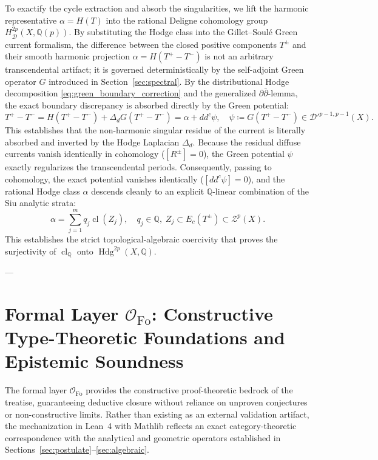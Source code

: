 \documentclass[11pt,a4paper]{article}
\theoremstyle{definition}
\theoremstyle{plain}
\DeclareMathOperator{\Hdg}{Hdg}
\DeclareMathOperator{\cl}{cl}
\begin{document}
To exactify the cycle extraction and absorb the singularities, we lift the harmonic representative $\alpha = H(T)$ into the rational Deligne cohomology group $H^{2p}_{\mathcal{D}}(X, \mathbb{Q}(p))$. By substituting the Hodge class into the Gillet--Soulé Green current formalism, the difference between the closed positive components $T^\pm$ and their smooth harmonic projection $\alpha = H(T^+ - T^-)$ is not an arbitrary transcendental artifact; it is governed deterministically by the self-adjoint Green operator $G$ introduced in Section~\ref{sec:spectral}. By the distributional Hodge decomposition \eqref{eq:green_boundary_correction} and the generalized $\partial \bar{\partial}$-lemma, the exact boundary discrepancy is absorbed directly by the Green potential:
\begin{equation}
    \label{eq:current_potential}
    T^+ - T^- = H(T^+ - T^-) + \Delta_d G(T^+ - T^-) = \alpha + dd^c \psi, \quad \psi \coloneqq G(T^+ - T^-) \in \mathcal{D}'^{p-1, p-1}(X).
\end{equation}
This establishes that the non-harmonic singular residue of the current is literally absorbed and inverted by the Hodge Laplacian $\Delta_d$. Because the residual diffuse currents vanish identically in cohomology ($[R^\pm] = 0$), the Green potential $\psi$ exactly regularizes the transcendental periods. Consequently, passing to cohomology, the exact potential vanishes identically ($[dd^c \psi] = 0$), and the rational Hodge class $\alpha$ descends cleanly to an explicit $\mathbb{Q}$-linear combination of the Siu analytic strata:
\begin{equation}
    \label{eq:cycle_decomposition}
    \alpha = \sum_{j=1}^m q_j \cl(Z_j), \quad q_j \in \mathbb{Q}, \; Z_j \subset E_c(T^\pm) \subset \mathcal{Z}^p(X).
\end{equation}
This establishes the strict topological-algebraic coercivity that proves the surjectivity of $\cl_{\mathbb{Q}}$ onto $\Hdg^{2p}(X, \mathbb{Q})$.

---

\section{Formal Layer $\mathcal{O}_{\mathrm{Fo}}$: Constructive Type-Theoretic Foundations and Epistemic Soundness}
\label{sec:formal}

The formal layer $\mathcal{O}_{\mathrm{Fo}}$ provides the constructive proof-theoretic bedrock of the treatise, guaranteeing deductive closure without reliance on unproven conjectures or non-constructive limits. Rather than existing as an external validation artifact, the mechanization in Lean~4 with Mathlib reflects an exact category-theoretic correspondence with the analytical and geometric operators established in Sections~\ref{sec:postulate}--\ref{sec:algebraic}.
\end{document}
